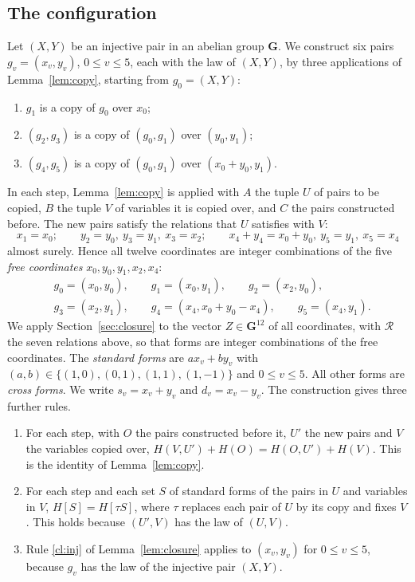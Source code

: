 \documentclass[11pt]{amsart}
\theoremstyle{definition}
\theoremstyle{remark}
\numberwithin{equation}{section}
\newcommand{\GG}{\mathbf{G}}
\begin{document}
\subsection{The configuration}\label{sec:config}
Let $(X,Y)$ be an injective pair in an abelian group $\GG$. We construct six pairs $g_v=(x_v,y_v)$, $0\le v\le5$, each with the law of $(X,Y)$, by three applications of Lemma~\ref{lem:copy}, starting from $g_0=(X,Y)$:
\begin{enumerate}[label=(S\arabic*)]
\item\label{S1} $g_1$ is a copy of $g_0$ over $x_0$;
\item\label{S2} $(g_2,g_3)$ is a copy of $(g_0,g_1)$ over $(y_0,y_1)$;
\item\label{S3} $(g_4,g_5)$ is a copy of $(g_0,g_1)$ over $(x_0+y_0,y_1)$.
\end{enumerate}
In each step, Lemma~\ref{lem:copy} is applied with $A$ the tuple $U$ of pairs to be copied, $B$ the tuple $V$ of variables it is copied over, and $C$ the pairs constructed before. The new pairs satisfy the relations that $U$ satisfies with $V$:
\[
x_1=x_0;\qquad y_2=y_0,\ y_3=y_1,\ x_3=x_2;\qquad x_4+y_4=x_0+y_0,\ y_5=y_1,\ x_5=x_4
\]
almost surely. Hence all twelve coordinates are integer combinations of the five \emph{free coordinates} $x_0,y_0,y_1,x_2,x_4$:
\begin{equation}\label{eq:config}
\begin{aligned}
&g_0=(x_0,y_0),\qquad g_1=(x_0,y_1),\qquad g_2=(x_2,y_0),\\
&g_3=(x_2,y_1),\qquad g_4=(x_4,x_0+y_0-x_4),\qquad g_5=(x_4,y_1).
\end{aligned}
\end{equation}
We apply Section~\ref{sec:closure} to the vector $Z\in\GG^{12}$ of all coordinates, with $\mathcal R$ the seven relations above, so that forms are integer combinations of the free coordinates. The \emph{standard forms} are $ax_v+by_v$ with $(a,b)\in\{(1,0),(0,1),(1,1),(1,-1)\}$ and $0\le v\le5$. All other forms are \emph{cross forms}. We write $s_v=x_v+y_v$ and $d_v=x_v-y_v$. The construction gives three further rules.
\begin{enumerate}[label=(\textsc{\roman*})]
\item[(CI)] For each step, with $O$ the pairs constructed before it, $U'$ the new pairs and $V$ the variables copied over, $H(V,U')+H(O)=H(O,U')+H(V)$. This is the identity of Lemma~\ref{lem:copy}.
\item[(EL)] For each step and each set $S$ of standard forms of the pairs in $U$ and variables in $V$, $H[S]=H[\tau S]$, where $\tau$ replaces each pair of $U$ by its copy and fixes $V$. This holds because $(U',V)$ has the law of $(U,V)$.
\item[(INJ)] Rule \ref{cl:inj} of Lemma~\ref{lem:closure} applies to $(x_v,y_v)$ for $0\le v\le5$, because $g_v$ has the law of the injective pair $(X,Y)$.
\end{enumerate}
\end{document}
